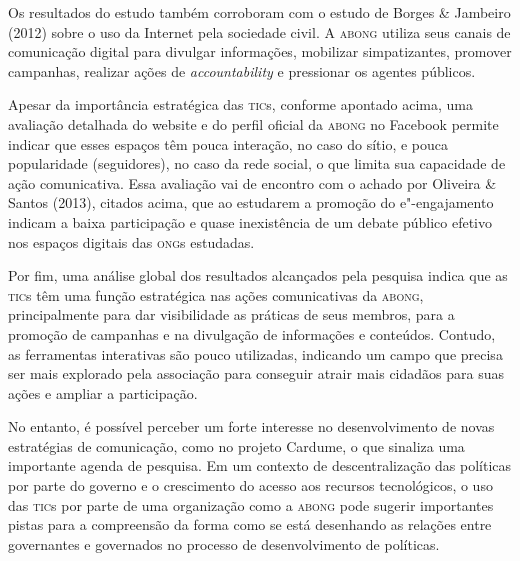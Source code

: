 Os resultados do estudo também corroboram com o estudo de Borges \&
Jambeiro (2012) sobre o uso da Internet pela sociedade civil. A \textsc{abong}
utiliza seus canais de comunicação digital para divulgar informações,
mobilizar simpatizantes, promover campanhas, realizar ações de
\emph{accountability} e pressionar os agentes públicos.

Apesar da importância estratégica das \textsc{tic}s, conforme apontado acima, uma
avaliação detalhada do website e do perfil oficial da \textsc{abong} no Facebook
permite indicar que esses espaços têm pouca interação, no caso do sítio,
e pouca popularidade (seguidores), no caso da rede social, o que limita
sua capacidade de ação comunicativa. Essa avaliação vai de encontro com
o achado por Oliveira \& Santos (2013), citados acima, que ao estudarem
a promoção do e"-engajamento indicam a baixa participação e quase
inexistência de um debate público efetivo nos espaços digitais das \textsc{ong}s
estudadas.

Por fim, uma análise global dos resultados alcançados pela pesquisa
indica que as \textsc{tic}s têm uma função estratégica nas ações comunicativas da
\textsc{abong}, principalmente para dar visibilidade as práticas de seus membros,
para a promoção de campanhas e na divulgação de informações e conteúdos.
Contudo, as ferramentas interativas são pouco utilizadas, indicando um
campo que precisa ser mais explorado pela associação para conseguir
atrair mais cidadãos para suas ações e ampliar a participação.

No entanto, é possível perceber um forte interesse no desenvolvimento de
novas estratégias de comunicação, como no projeto Cardume, o que
sinaliza uma importante agenda de pesquisa. Em um contexto de
descentralização das políticas por parte do governo e o crescimento do
acesso aos recursos tecnológicos, o uso das \textsc{tic}s por parte de uma
organização como a \textsc{abong} pode sugerir importantes pistas para a
compreensão da forma como se está desenhando as relações entre
governantes e governados no processo de desenvolvimento de políticas.


